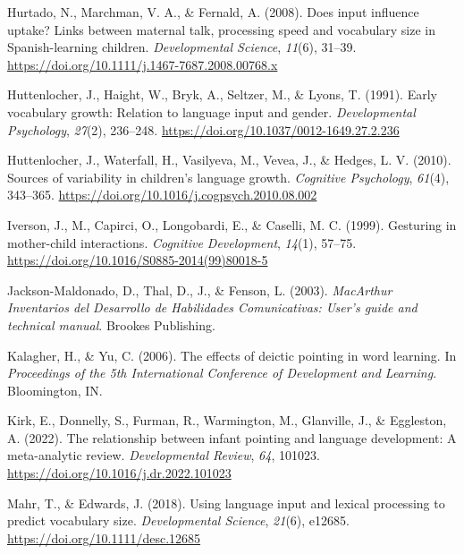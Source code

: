 \documentclass[
  english,
  man,floatsintext]{apa6}
\begin{document}
\leavevmode\hypertarget{ref-hurtado_does_2008}{}%
Hurtado, N., Marchman, V. A., \& Fernald, A. (2008). Does input influence uptake? Links between maternal talk, processing speed and vocabulary size in Spanish-learning children. \emph{Developmental Science}, \emph{11}(6), 31--39. \url{https://doi.org/10.1111/j.1467-7687.2008.00768.x}

\leavevmode\hypertarget{ref-huttenlocher_early_1991}{}%
Huttenlocher, J., Haight, W., Bryk, A., Seltzer, M., \& Lyons, T. (1991). Early vocabulary growth: Relation to language input and gender. \emph{Developmental Psychology}, \emph{27}(2), 236--248. \url{https://doi.org/10.1037/0012-1649.27.2.236}

\leavevmode\hypertarget{ref-huttenlocher_sources_2010}{}%
Huttenlocher, J., Waterfall, H., Vasilyeva, M., Vevea, J., \& Hedges, L. V. (2010). Sources of variability in children's language growth. \emph{Cognitive Psychology}, \emph{61}(4), 343--365. \url{https://doi.org/10.1016/j.cogpsych.2010.08.002}

\leavevmode\hypertarget{ref-iverson_gesturing_1999}{}%
Iverson, J., M., Capirci, O., Longobardi, E., \& Caselli, M. C. (1999). Gesturing in mother-child interactions. \emph{Cognitive Development}, \emph{14}(1), 57--75. \url{https://doi.org/10.1016/S0885-2014(99)80018-5}

\leavevmode\hypertarget{ref-jackson-maldonado_macarthur_2003}{}%
Jackson-Maldonado, D., Thal, D., J., \& Fenson, L. (2003). \emph{MacArthur Inventarios del Desarrollo de Habilidades Comunicativas: User's guide and technical manual}. Brookes Publishing.

\leavevmode\hypertarget{ref-kalagher_effects_2006}{}%
Kalagher, H., \& Yu, C. (2006). The effects of deictic pointing in word learning. In \emph{Proceedings of the 5th International Conference of Development and Learning}. Bloomington, IN.

\leavevmode\hypertarget{ref-kirk_relationship_2022}{}%
Kirk, E., Donnelly, S., Furman, R., Warmington, M., Glanville, J., \& Eggleston, A. (2022). The relationship between infant pointing and language development: A meta-analytic review. \emph{Developmental Review}, \emph{64}, 101023. \url{https://doi.org/10.1016/j.dr.2022.101023}

\leavevmode\hypertarget{ref-mahr_using_2018}{}%
Mahr, T., \& Edwards, J. (2018). Using language input and lexical processing to predict vocabulary size. \emph{Developmental Science}, \emph{21}(6), e12685. \url{https://doi.org/10.1111/desc.12685}
\end{document}
